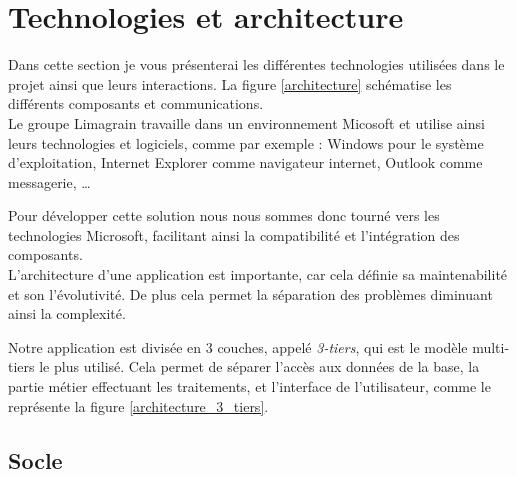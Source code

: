 \section{Technologies et architecture}

Dans cette section je vous présenterai les différentes technologies utilisées dans le projet ainsi que leurs interactions. La figure \ref{architecture} schématise les différents composants et communications.
~~\\

Le groupe Limagrain travaille dans un environnement Micosoft et utilise ainsi leurs technologies et logiciels, comme par exemple : Windows pour le système d'exploitation, Internet Explorer comme navigateur internet, Outlook comme messagerie, \ldots

Pour développer cette solution nous nous sommes donc tourné vers les technologies Microsoft, facilitant ainsi la compatibilité et l'intégration des composants.
\\

L'architecture d'une application est importante, car cela définie sa maintenabilité et son l'évolutivité. De plus cela permet la séparation des problèmes diminuant ainsi la complexité.

Notre application est divisée en 3 couches, appelé \textit{3-tiers}, qui est le modèle multi-tiers le plus utilisé. Cela permet de séparer l'accès aux données de la base, la partie métier effectuant les traitements, et l'interface de l'utilisateur, comme le représente la figure \ref{architecture_3_tiers}.


\subsection{Socle}

